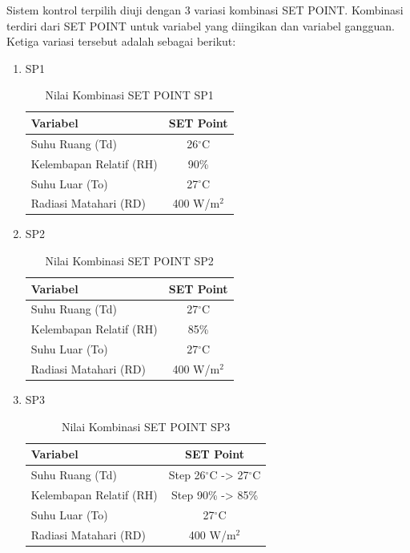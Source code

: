Sistem kontrol terpilih diuji dengan 3 variasi kombinasi SET POINT. Kombinasi terdiri dari SET POINT untuk variabel yang diingikan dan variabel gangguan. Ketiga variasi tersebut adalah sebagai berikut:
\begin{enumerate}
	\item SP1
	\begin{table}[!h]
		\caption{Nilai Kombinasi SET POINT SP1}
		\label{tbl:5:SP1Combination}
		\centering
		\begin{tabular}{|l|c|}
			\hline
			\textbf{Variabel} & \textbf{SET Point} \\ \hline
			Suhu Ruang (Td) & 26$^\circ$C          \\ \hline
			Kelembapan Relatif (RH) & 90\%         \\ \hline
			Suhu Luar (To) & 27$^\circ$C           \\ \hline
			Radiasi Matahari (RD) & 400 W/m$^2$    \\ \hline
		\end{tabular}
	\end{table}
	
	\item SP2
	\begin{table}[!h]
		\caption{Nilai Kombinasi SET POINT SP2}
		\label{tbl:5:SP2Combination}
		\centering
		\begin{tabular}{|l|c|}
			\hline
			\textbf{Variabel} & \textbf{SET Point} \\ \hline
			Suhu Ruang (Td) & 27$^\circ$C          \\ \hline
			Kelembapan Relatif (RH) & 85\%         \\ \hline
			Suhu Luar (To) & 27$^\circ$C           \\ \hline
			Radiasi Matahari (RD) & 400 W/m$^2$    \\ \hline
		\end{tabular}
	\end{table}
	
	\item SP3
	\begin{table}[!h]
		\caption{Nilai Kombinasi SET POINT SP3}
		\label{tbl:5:SP3Combination}
		\centering
		\begin{tabular}{|l|c|}
			\hline
			\textbf{Variabel} & \textbf{SET Point} \\ \hline
			Suhu Ruang (Td) & Step 26$^\circ$C -> 27$^\circ$C \\ \hline
			Kelembapan Relatif (RH) & Step 90\% -> 85\% \\ \hline
			Suhu Luar (To) & 27$^\circ$C           \\ \hline
			Radiasi Matahari (RD) & 400 W/m$^2$    \\ \hline
		\end{tabular}
	\end{table}
\end{enumerate}

